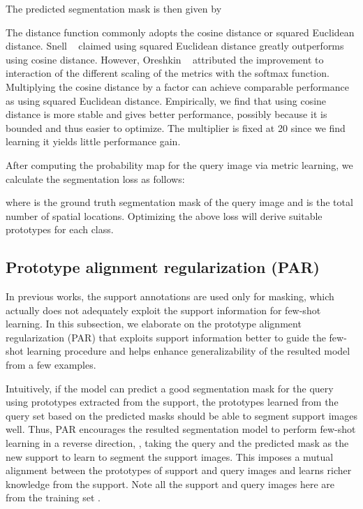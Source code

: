 \documentclass[10pt,twocolumn,letterpaper]{article}
\begin{document}
The predicted segmentation mask is then given by


 The distance function  commonly adopts the cosine distance or squared Euclidean distance. Snell \etal~\cite{snell2017prototypical} claimed using squared Euclidean distance greatly outperforms using cosine distance. However, Oreshkin \etal~\cite{oreshkin2018tadam} attributed the improvement to interaction of the different scaling of the metrics with the softmax function. Multiplying the cosine distance by a factor  can achieve comparable performance as using squared Euclidean distance. Empirically, we find that using cosine distance is more stable and gives better performance, possibly because it is bounded and thus easier to optimize. The multiplier  is fixed at 20 since we find learning it yields little performance gain.

After computing the probability map  for the query image via metric learning, we calculate the segmentation loss   as follows:

where  is the ground truth segmentation mask of the query image and  is the total number of spatial locations. Optimizing the above loss will derive suitable prototypes for each class.


\subsection{Prototype alignment regularization (PAR)} \label{sec:method-par}

In previous works, the support annotations are used only for masking, which actually does not adequately exploit the support information for few-shot learning. In this subsection, we elaborate on the prototype alignment regularization (PAR) that exploits support information better to guide the few-shot learning procedure and helps enhance generalizability of the resulted model from a few examples. 


Intuitively, if the model can predict a good segmentation mask for the query using prototypes extracted from the support, the prototypes learned from the query set based on the predicted masks should be able to segment support images well. Thus, PAR encourages the resulted segmentation model to perform few-shot learning in a reverse direction, \ie, taking the query and the predicted mask as the new support to learn to segment the support images. This imposes a mutual alignment between the prototypes of support and query images and learns richer knowledge from the support. Note all the support and query images here are from the training set .
\end{document}
